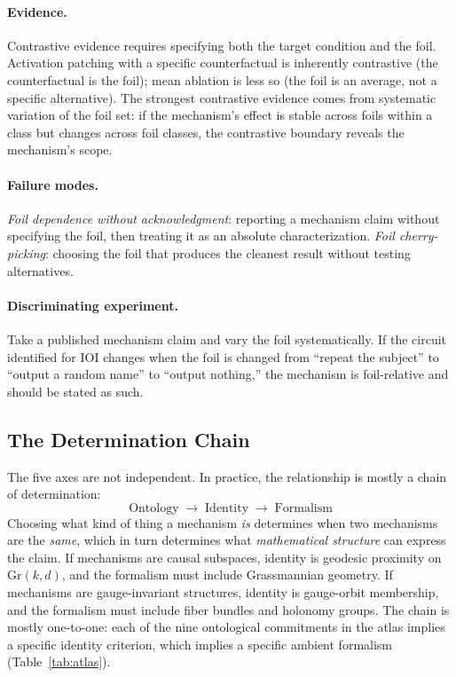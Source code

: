 \documentclass{article}
\newcommand{\Gr}{\mathrm{Gr}}
\begin{document}
\paragraph{Evidence.}
Contrastive evidence requires specifying both the target condition and
the foil.  Activation patching with a specific counterfactual is
inherently contrastive (the counterfactual is the foil); mean ablation
is less so (the foil is an average, not a specific alternative).  The
strongest contrastive evidence comes from systematic variation of the
foil set: if the mechanism's effect is stable across foils within a
class but changes across foil classes, the contrastive boundary reveals
the mechanism's scope.

\paragraph{Failure modes.}
\emph{Foil dependence without acknowledgment}: reporting a mechanism
claim without specifying the foil, then treating it as an absolute
characterization.  \emph{Foil cherry-picking}: choosing the foil that
produces the cleanest result without testing alternatives.

\paragraph{Discriminating experiment.}
Take a published mechanism claim and vary the foil systematically.  If
the circuit identified for IOI changes when the foil is changed from
``repeat the subject'' to ``output a random name'' to ``output nothing,''
the mechanism is foil-relative and should be stated as such.

\subsection{The Determination Chain}\label{sec:chain}

The five axes are not independent.  In practice, the relationship is
mostly a chain of determination:
\[
\text{Ontology} \;\longrightarrow\; \text{Identity} \;\longrightarrow\; \text{Formalism}
\]
Choosing what kind of thing a mechanism \emph{is} determines when two
mechanisms are the \emph{same}, which in turn determines what
\emph{mathematical structure} can express the claim.  If mechanisms are
causal subspaces, identity is geodesic proximity on $\Gr(k,d)$, and the
formalism must include Grassmannian geometry.  If mechanisms are
gauge-invariant structures, identity is gauge-orbit membership, and the
formalism must include fiber bundles and holonomy groups.  The chain is
mostly one-to-one: each of the nine ontological commitments in the atlas
implies a specific identity criterion, which implies a specific ambient
formalism (Table~\ref{tab:atlas}).
\end{document}
